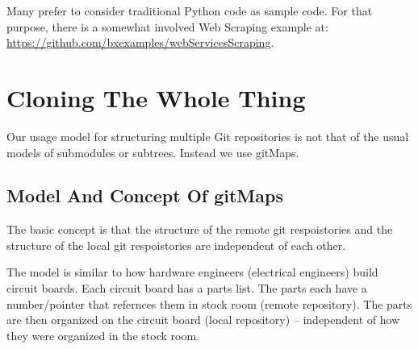 Many prefer to consider traditional Python code as sample code.
For that purpose, there is a somewhat involved Web Scraping example at:
\url{https://github.com/bxexamples/webServicesScraping}.


\begin{comment}
*  [[elisp:(org-cycle)][| ]] [[elisp:(org-show-subtree)][|=]] [[elisp:(show-children 10)][|V]] [[elisp:(bx:orgm:indirectBufOther)][|>]] [[elisp:(bx:orgm:indirectBufMain)][|I]] [[elisp:(blee:ppmm:org-mode-toggle)][|N]] [[elisp:(org-top-overview)][|O]] [[elisp:(progn (org-shifttab) (org-content))][|C]] [[elisp:(delete-other-windows)][|1]]  /Section/   Cloning The Whole Thing ::  [[elisp:(org-cycle)][| ]]
\end{comment}

\section{Cloning The Whole Thing}
\label{sec:CloningTheWholeThing}

Our usage model for structuring multiple Git repositories is not that
of the usual models of submodules or subtrees. Instead we use gitMaps.

\begin{comment}
**  [[elisp:(org-cycle)][| ]] [[elisp:(org-show-subtree)][|=]] [[elisp:(show-children 10)][|V]] [[elisp:(bx:orgm:indirectBufOther)][|>]] [[elisp:(bx:orgm:indirectBufMain)][|I]] [[elisp:(blee:ppmm:org-mode-toggle)][|N]] [[elisp:(org-top-overview)][|O]] [[elisp:(progn (org-shifttab) (org-content))][|C]] [[elisp:(delete-other-windows)][|1]]  /Subsection/   Model And Concept Of gitMaps ::  [[elisp:(org-cycle)][| ]]
\end{comment}

\subsection{Model And Concept Of gitMaps}
\label{sec:ModelAndConceptOfgitMaps}

The basic concept is that the structure of the remote git respoistories and 
the structure of the local git respoistories are independent of each other.

The model is similar to how hardware engineers (electrical engineers)
build circuit boards. Each circuit board has a parts list. The parts
each have a number/pointer that refernces them in stock room (remote
repository).  The parts are then organized on the circuit board (local
repository) -- independent of how they were organized in the stock
room.


